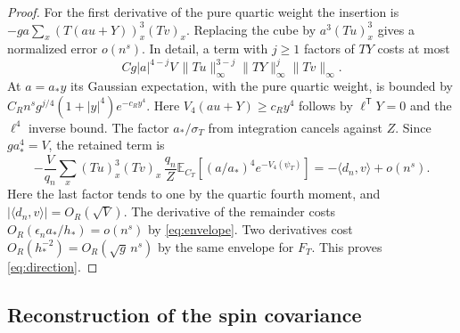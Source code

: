 \documentclass[11pt]{article}
\numberwithin{equation}{section}
\newcommand{\E}{\mathbb E}
\newcommand{\ip}[2]{\langle #1,#2\rangle}
\begin{document}
\begin{proof}
For the first derivative of the pure quartic weight the insertion is
$-g a\sum_x(T(au+Y))_x^3(Tv)_x$. Replacing the cube by
$a^3(Tu)_x^3$ gives a normalized error $o(n^s)$. In detail, a term
with $j\ge1$ factors of $TY$ costs at most
\begin{equation}
 C g|a|^{4-j}V\,\|Tu\|_\infty^{3-j}
                    \|TY\|_\infty^j\|Tv\|_\infty .
\end{equation}
At $a=a_* y$ its Gaussian expectation, with the pure quartic
weight, is bounded by $C_R n^s g^{j/4}(1+|y|^4)e^{-c_R y^4}$.
Here $V_4(au+Y)\ge c_R y^4$ follows by $\ell^{\mathsf T}Y=0$ and
the $\ell^4$ inverse bound. The factor $a_*/\sigma_T$ from
integration cancels against $Z$. Since $ga_*^4=V$, the retained term is
\begin{equation}
 -\frac{V}{q_n}\sum_x(Tu)_x^3(Tv)_x\,
       \frac{q_n}{Z}\E_{C_T}\!\left[(a/a_*)^4e^{-V_4(\psi_T)}\right]
 =-\ip{d_n}{v}+o(n^s).
\end{equation}
Here the last factor tends to one by the quartic fourth moment, and
$|\ip{d_n}{v}|=O_R(\sqrt V)$. The derivative of the remainder
costs $O_R(\epsilon_n a_*/h_*)=o(n^s)$ by
\eqref{eq:envelope}. Two derivatives cost
$O_R(h_*^{-2})=O_R(\sqrt g\,n^s)$ by the same envelope for
$F_T$. This proves \eqref{eq:direction}.
\end{proof}

\subsection{Reconstruction of the spin covariance}
\end{document}
